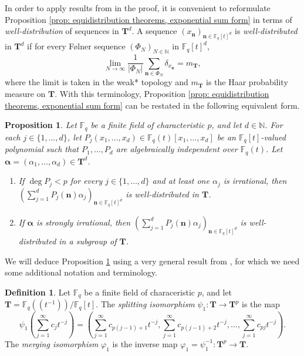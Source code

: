\documentclass{amsart}
\newtheorem{proposition}[theorem]{Proposition}
\theoremstyle{definition}
\newtheorem{definition}[theorem]{Definition}
\numberwithin{equation}{section}
\newcommand{\N}{\mathbb{N}}
\newcommand{\F}{\mathbb{F}}
\begin{document}
In order to apply results from \cite{bl} in the proof, it is convenient to reformulate Proposition \ref{prop: equidistribution theorems, exponential sum form} in terms of \emph{well-distribution} of sequences in $\mathbf{T}^d$.
A sequence $(x_{\bm{n}})_{\bm{n} \in \F_q[t]^d}$ is \emph{well-distributed} in $\mathbf{T}^d$ if for every F{\o}lner sequence $(\Phi_N)_{N \in \N}$ in $\F_q[t]^d$,
\begin{equation*}
    \lim_{N \to \infty} \frac{1}{|\Phi_N|} \sum_{\bm{n} \in \Phi_N} \delta_{x_{\bm{n}}} = m_{\mathbf{T}},
\end{equation*}
where the limit is taken in the weak* topology and $m_{\mathbf{T}}$ is the Haar probability measure on $\mathbf{T}$.
With this terminology, Proposition \ref{prop: equidistribution theorems, exponential sum form} can be restated in the following equivalent form.

\begin{proposition} \label{prop: equidistribution theorems}
    Let $\F_q$ be a finite field of characteristic $p$, and let $d \in \N$.
    For each $j \in \{1, \dots, d\}$, let $P_j(x_1, \dots, x_d) \in \F_q(t)[x_1, \dots, x_d]$ be an $\F_q[t]$-valued polynomial such that $P_1, \dots, P_d$ are algebraically independent over $\F_q(t)$.
    Let $\bm{\alpha} = (\alpha_1, \ldots, \alpha_d) \in \mathbf{T}^d$.
    \begin{enumerate}[(1)]
        \item If $\deg{P_j} < p$ for every $j \in \{1, \ldots, d\}$ and at least one $\alpha_j$ is irrational, then $\left( \sum_{j=1}^d P_j(\bm{n})\alpha_j \right)_{\bm{n}\in\F_q[t]^d}$ is well-distributed in $\mathbf{T}$.
        \item If $\bm{\alpha}$ is strongly irrational, then $\left( \sum_{j=1}^d P_j(\bm{n})\alpha_j \right)_{\bm{n}\in\F_q[t]^d}$ is well-distributed in a subgroup of $\mathbf{T}$.
    \end{enumerate}
\end{proposition}

We will deduce Proposition \ref{prop: equidistribution theorems} using a very general result from \cite{bl}, for which we need some additional notation and terminology.

\begin{definition}
    Let $\F_q$ be a finite field of characeristic $p$, and let $\mathbf{T} = \F_q((t^{-1}))/\F_q[t]$.
    The \emph{splitting isomorphism} $\psi_1 : \mathbf{T} \to \mathbf{T}^p$ is the map
    \begin{equation*}
        \psi_1 \left( \sum_{j=1}^{\infty} c_j t^{-j} \right) = \left( \sum_{j=1}^{\infty} c_{p(j-1)+1}t^{-j}, \sum_{j=1}^{\infty} c_{p(j-1)+2}t^{-j}, \ldots, \sum_{j=1}^{\infty} c_{pj}t^{-j} \right).
    \end{equation*}
    The \emph{merging isomorphism} $\varphi_1$ is the inverse map $\varphi_1 = \psi_1^{-1} : \mathbf{T}^p \to \mathbf{T}$.
\end{definition}
\end{document}
